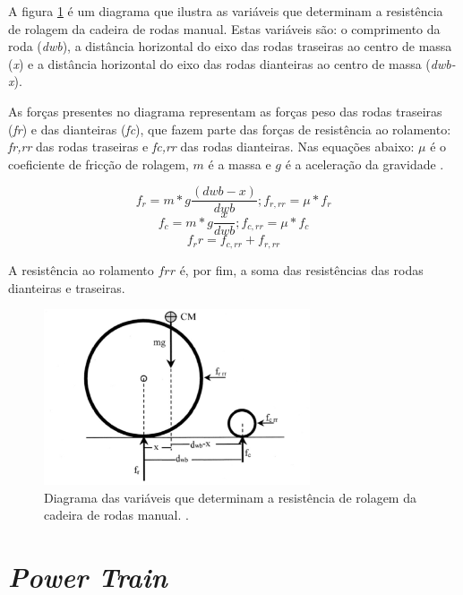 	A figura \ref{fig:diagrama_variaveis} é um diagrama que ilustra as variáveis que determinam a resistência de rolagem da cadeira de rodas manual. Estas variáveis são: o comprimento da roda (\textit{dwb}), a distância horizontal do eixo das rodas traseiras ao centro de massa (\textit{x}) e a distância horizontal do eixo das rodas dianteiras ao centro de massa (\textit{dwb-x}).

	As forças presentes no diagrama representam as forças peso das rodas traseiras (\textit{fr}) e das dianteiras (\textit{fc}), que fazem parte das forças de resistência ao rolamento: \textit{fr,rr} das rodas traseiras e \textit{fc,rr} das rodas dianteiras. Nas equações abaixo: $\mu$ é o coeficiente de fricção de rolagem, $m$ é a massa e $g$ é a aceleração da gravidade \cite{propulsao_cadeira}.

	\begin{equation}
		f_r=m*g\frac{(dwb-x)}{dwb} ; f_{r,rr}=\mu*f_r
	\end{equation}
	\begin{equation}
		f_c=m*g\frac{x}{dwb} ; f_{c,rr}=\mu*f_c
	\end{equation}
	\begin{equation}
	f_rr=f_{c,rr}+ f_{r,rr}
	\end{equation}

	A resistência ao rolamento $frr$ é, por fim, a soma das resistências das rodas dianteiras e traseiras.

	\begin{figure}[!h]
		\centering
		\includegraphics[width = 0.7\textwidth]{figuras/resultados/diagrama_variaveis}
		\caption{Diagrama das variáveis que determinam a resistência de rolagem da cadeira de rodas manual. \cite{propulsao_cadeira}.}
		\label{fig:diagrama_variaveis}
	\end{figure}


\section{\textit{Power Train}}

